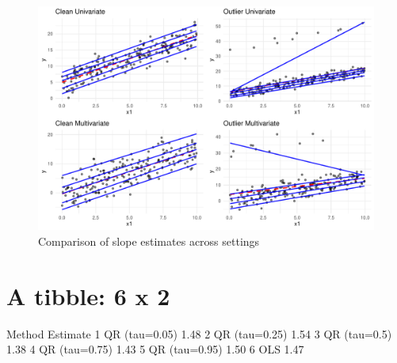 \documentclass[fleqn,8pt]{latex/stylish_article} %
\newenvironment{Shaded}{\begin{snugshade}}{\end{snugshade}}
\newcommand{\SpecialCharTok}[1]{\textcolor[rgb]{0.00,0.00,0.00}{{#1}}}
\newcommand{\StringTok}[1]{\textcolor[rgb]{0.31,0.60,0.02}{{#1}}}
\newcommand{\OtherTok}[1]{\textcolor[rgb]{0.56,0.35,0.01}{{#1}}}
\newcommand{\FunctionTok}[1]{\textcolor[rgb]{0.00,0.00,0.00}{{#1}}}
\newcommand{\ControlFlowTok}[1]{\textcolor[rgb]{0.13,0.29,0.53}{\textbf{{#1}}}}
\newcommand{\AttributeTok}[1]{\textcolor[rgb]{0.77,0.63,0.00}{{#1}}}
\newcommand{\NormalTok}[1]{{#1}}
\begin{document}
\begin{figure}

{\centering \includegraphics[width=0.8\linewidth]{ADR_project_files/figure-latex/boxplots-2x2-1} 

}

\caption{Comparison of slope estimates across settings}\label{fig:boxplots-2x2}
\end{figure}

\begin{Shaded}
\end{Shaded}

\section{A tibble: 6 x 2}\label{a-tibble-6-x-2}

Method Estimate
1 QR (tau=0.05) 1.48
2 QR (tau=0.25) 1.54
3 QR (tau=0.5) 1.38
4 QR (tau=0.75) 1.43
5 QR (tau=0.95) 1.50
6 OLS 1.47
\end{document}
